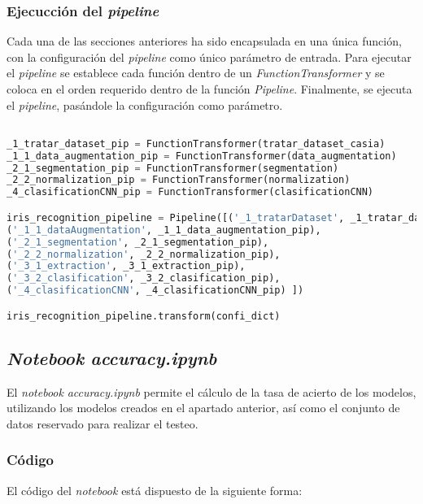 {\subsubsection{Ejecucción del \textit{pipeline}}

Cada una de las secciones anteriores ha sido encapsulada en una única función, con la configuración del \textit{pipeline} como único parámetro de entrada.
Para ejecutar el \textit{pipeline} se establece cada función dentro de un \textit{FunctionTransformer} y se coloca en el orden requerido dentro de la función \textit{Pipeline}.
Finalmente, se ejecuta el \textit{pipeline}, pasándole la configuración como parámetro.


\begin{lstlisting}[language=Python] 

_1_tratar_dataset_pip = FunctionTransformer(tratar_dataset_casia)
_1_1_data_augmentation_pip = FunctionTransformer(data_augmentation)
_2_1_segmentation_pip = FunctionTransformer(segmentation)
_2_2_normalization_pip = FunctionTransformer(normalization)
_4_clasificationCNN_pip = FunctionTransformer(clasificationCNN)

iris_recognition_pipeline = Pipeline([('_1_tratarDataset', _1_tratar_dataset_pip), 
('_1_1_dataAugmentation', _1_1_data_augmentation_pip), 
('_2_1_segmentation', _2_1_segmentation_pip), 
('_2_2_normalization', _2_2_normalization_pip),
('_3_1_extraction', _3_1_extraction_pip),
('_3_2_clasification', _3_2_clasification_pip), 
('_4_clasificationCNN', _4_clasificationCNN_pip) ])

iris_recognition_pipeline.transform(confi_dict)

\end{lstlisting} 

\subsection{\textit{Notebook} \textit{accuracy.ipynb}} \label{anx:accuracy}

El \textit{notebook} \textit{accuracy.ipynb} permite el cálculo de la tasa de acierto de los modelos, utilizando los modelos creados en el apartado anterior,
así como el conjunto de datos reservado para realizar el testeo.

\subsubsection{Código}

El código del \textit{notebook} está dispuesto de la siguiente forma:

}
